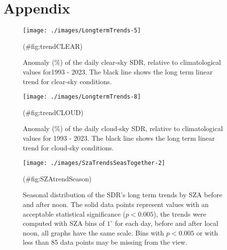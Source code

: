 \documentclass[
  preprint, 3p, authoryear]{article}
\begin{document}
\hypertarget{appendix}{%
\section*{Appendix}\label{appendix}}

\begin{figure}[h!]

{\centering \texttt{[image: ./images/LongtermTrends-5]} 

}

\caption{Anomaly (\%) of the daily clear-sky SDR, relative to climatological values for1993 - 2023. The black line shows the long term linear trend for clear-sky conditions.}(\#fig:trendCLEAR)
\end{figure}

\begin{figure}[h!]

{\centering \texttt{[image: ./images/LongtermTrends-8]} 

}

\caption{Anomaly (\%) of the daily cloud-sky SDR, relative to climatological values for 1993 - 2023. The black line shows the long term linear trend for cloud-sky conditions.}(\#fig:trendCLOUD)
\end{figure}

\begin{figure}[h!]

{\centering \texttt{[image: ./images/SzaTrendsSeasTogether-2]} 

}

\caption{Seasonal distribution of the SDR's long term trends by SZA before and after noon. The solid data points represent values with an acceptable statistical significance ($p<0.005$), the trends were computed with SZA bins of $1^\circ$ for each day, before and after local noon, all graphs have the same scale. Bins with $p<0.005$ or with less than 85 data points may be missing from the view.}(\#fig:SZAtrendSeason)
\end{figure}
\end{document}
